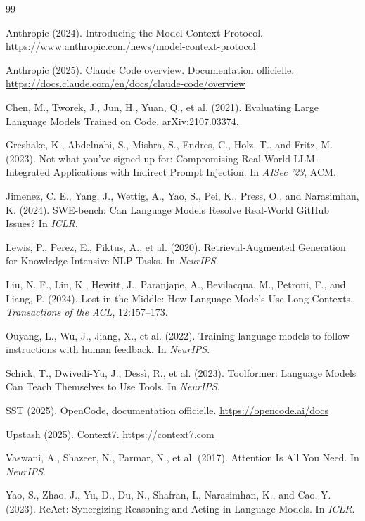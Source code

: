 \documentclass[11pt,a4paper]{article}
\begin{document}
\begin{thebibliography}{99}
\small
\begin{english}

Anthropic (2024). Introducing the Model Context Protocol. \url{https://www.anthropic.com/news/model-context-protocol}

Anthropic (2025). Claude Code overview. Documentation officielle. \url{https://docs.claude.com/en/docs/claude-code/overview}

Chen, M., Tworek, J., Jun, H., Yuan, Q., et al. (2021). Evaluating Large Language Models Trained on Code. arXiv:2107.03374.

Greshake, K., Abdelnabi, S., Mishra, S., Endres, C., Holz, T., and Fritz, M. (2023). Not what you've signed up for: Compromising Real-World LLM-Integrated Applications with Indirect Prompt Injection. In \emph{AISec '23}, ACM.

Jimenez, C. E., Yang, J., Wettig, A., Yao, S., Pei, K., Press, O., and Narasimhan, K. (2024). SWE-bench: Can Language Models Resolve Real-World GitHub Issues? In \emph{ICLR}.

Lewis, P., Perez, E., Piktus, A., et al. (2020). Retrieval-Augmented Generation for Knowledge-Intensive NLP Tasks. In \emph{NeurIPS}.

Liu, N. F., Lin, K., Hewitt, J., Paranjape, A., Bevilacqua, M., Petroni, F., and Liang, P. (2024). Lost in the Middle: How Language Models Use Long Contexts. \emph{Transactions of the ACL}, 12:157--173.

Ouyang, L., Wu, J., Jiang, X., et al. (2022). Training language models to follow instructions with human feedback. In \emph{NeurIPS}.

Schick, T., Dwivedi-Yu, J., Dessì, R., et al. (2023). Toolformer: Language Models Can Teach Themselves to Use Tools. In \emph{NeurIPS}.

SST (2025). OpenCode, documentation officielle. \url{https://opencode.ai/docs}

Upstash (2025). Context7. \url{https://context7.com}

Vaswani, A., Shazeer, N., Parmar, N., et al. (2017). Attention Is All You Need. In \emph{NeurIPS}.

Yao, S., Zhao, J., Yu, D., Du, N., Shafran, I., Narasimhan, K., and Cao, Y. (2023). ReAct: Synergizing Reasoning and Acting in Language Models. In \emph{ICLR}.

\end{english}
\end{thebibliography}
\end{document}
